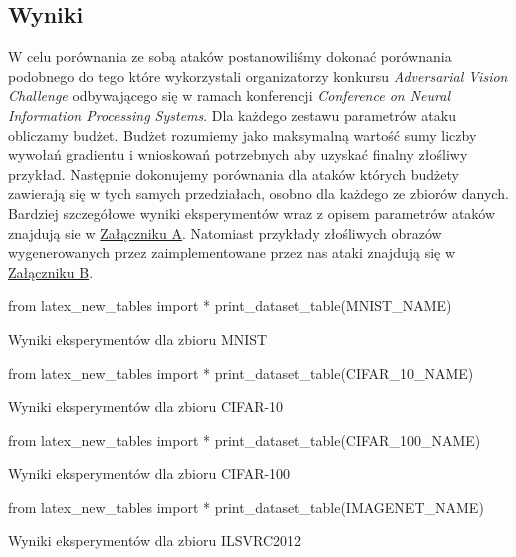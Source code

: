 \documentclass[
    left=2.5cm,         %
    right=2.5cm,        %
    top=2.5cm,          %
    bottom=3cm,         %
    bindingoffset=6mm,  %
    nohyphenation=false %
]{eiti/eiti-thesis}
\begin{document}
\subsection{Wyniki}
W celu porównania ze sobą ataków postanowiliśmy dokonać porównania podobnego do tego które wykorzystali organizatorzy konkursu
\textit{Adversarial Vision Challenge}\cite{DBLP:journals/corr/abs-1808-01976} odbywającego się w ramach konferencji \textit{Conference on Neural Information Processing Systems}.
Dla każdego zestawu parametrów ataku obliczamy budżet.
Budżet rozumiemy jako maksymalną wartość sumy liczby wywołań gradientu i wnioskowań potrzebnych aby uzyskać finalny złośliwy przykład.
Następnie dokonujemy porównania dla ataków których budżety zawierają się w tych samych przedziałach, osobno dla każdego ze zbiorów danych.
Bardziej szczegółowe wyniki eksperymentów wraz z opisem parametrów ataków znajdują sie w \hyperlink{appendix_tables}{Załączniku A}.
Natomiast przykłady złośliwych obrazów wygenerowanych przez zaimplementowane przez nas ataki znajdują się w \hyperlink{appendix_images}{Załączniku B}.
\begin{table}[!htbp]
\begin{adjustbox}{max width=\textwidth}
\begin{pycode}
from latex_new_tables import *
print_dataset_table(MNIST_NAME)
\end{pycode}
\end{adjustbox}
\caption{Wyniki eksperymentów dla zbioru MNIST}
\label{table:mnist_budget}
\end{table}
\begin{table}[!htbp]
\begin{adjustbox}{max width=\textwidth}
\begin{pycode}
from latex_new_tables import *
print_dataset_table(CIFAR_10_NAME)
\end{pycode}
\end{adjustbox}
\caption{Wyniki eksperymentów dla zbioru CIFAR-10}
\label{table:cifar10_budget}
\end{table}
\begin{table}[!htbp]
\begin{adjustbox}{max width=\textwidth}
\begin{pycode}
from latex_new_tables import *
print_dataset_table(CIFAR_100_NAME)
\end{pycode}
\end{adjustbox}
\caption{Wyniki eksperymentów dla zbioru CIFAR-100}
\label{table:cifar100_budget}
\end{table}
\begin{table}[!htbp]
\begin{adjustbox}{max width=\textwidth}
\begin{pycode}
from latex_new_tables import *
print_dataset_table(IMAGENET_NAME)
\end{pycode}
\end{adjustbox}
\caption{Wyniki eksperymentów dla zbioru ILSVRC2012}
\label{table:imagenet_budget}
\end{table}
\raggedbottom
\end{document}
